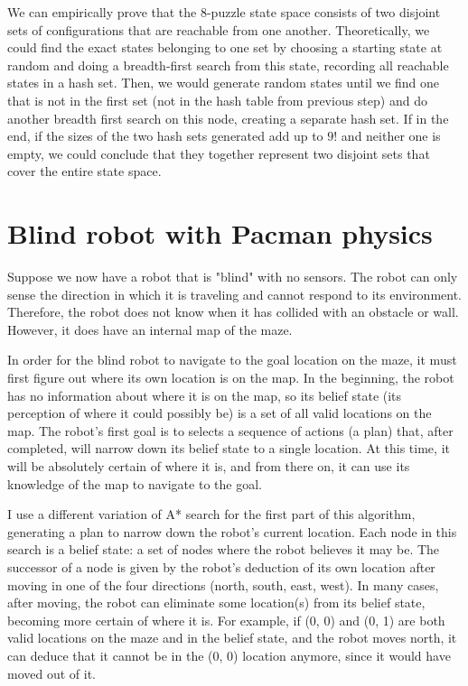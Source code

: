 \documentclass{article}
\begin{document}
We can empirically prove that the 8-puzzle state space consists of two disjoint sets of configurations that are reachable from one another. Theoretically, we could find the exact states belonging to one set by choosing a starting state at random and doing a breadth-first search from this state, recording all reachable states in a hash set. Then, we would generate random states until we find one that is not in the first set (not in the hash table from previous step) and do another breadth first search on this node, creating a separate hash set. If in the end, if the sizes of the two hash sets generated add up to $9!$ and neither one is empty, we could conclude that they together represent two disjoint sets that cover the entire state space.

\section{Blind robot with Pacman physics}

Suppose we now have a robot that is "blind" with no sensors. The robot can only sense the direction in which it is traveling and cannot respond to its environment. Therefore, the robot does not know when it has collided with an obstacle or wall. However, it does have an internal map of the maze.

In order for the blind robot to navigate to the goal location on the maze, it must first figure out where its own location is on the map. In the beginning, the robot has no information about where it is on the map, so its belief state (its perception of where it could possibly be) is a set of all valid locations on the map. The robot's first goal is to selects a sequence of actions (a plan) that, after completed, will narrow down its belief state to a single location. At this time, it will be absolutely certain of where it is, and from there on, it can use its knowledge of the map to navigate to the goal.

I use a different variation of A* search for the first part of this algorithm, generating a plan to narrow down the robot's current location. Each node in this search is a belief state: a set of nodes where the robot believes it may be. The successor of a node is given by the robot's deduction of its own location after moving in one of the four directions (north, south, east, west). In many cases, after moving, the robot can eliminate some location(s) from its belief state, becoming more certain of where it is. For example, if (0, 0) and (0, 1) are both valid locations on the maze and in the belief state, and the robot moves north, it can deduce that it cannot be in the (0, 0) location anymore, since it would have moved out of it.
\end{document}
